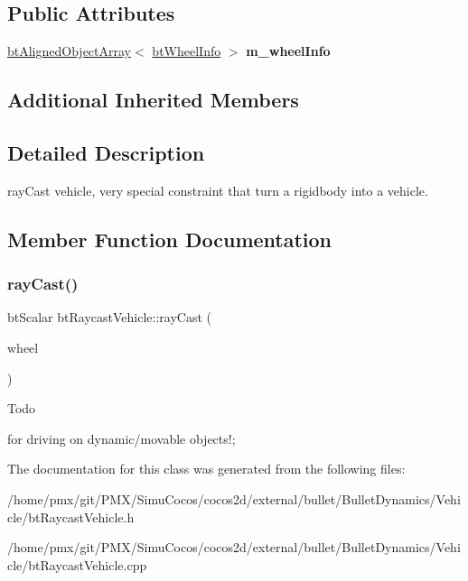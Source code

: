 \subsection*{Public Attributes}
\begin{DoxyCompactItemize}
\item 
\mbox{\label{classbtRaycastVehicle_aae4a5468270c26dbfa0b882092fac990}} 
\hyperlink{classbtAlignedObjectArray}{bt\+Aligned\+Object\+Array}$<$ \hyperlink{structbtWheelInfo}{bt\+Wheel\+Info} $>$ {\bfseries m\+\_\+wheel\+Info}
\end{DoxyCompactItemize}
\subsection*{Additional Inherited Members}


\subsection{Detailed Description}
ray\+Cast vehicle, very special constraint that turn a rigidbody into a vehicle. 

\subsection{Member Function Documentation}
\mbox{\label{classbtRaycastVehicle_a53451c4e3495561f3f078b2041ef04be}} 
\subsubsection{\texorpdfstring{ray\+Cast()}{rayCast()}}
{\footnotesize\ttfamily bt\+Scalar bt\+Raycast\+Vehicle\+::ray\+Cast (\begin{DoxyParamCaption}\item[{\hyperlink{structbtWheelInfo}{bt\+Wheel\+Info} \&}]{wheel }\end{DoxyParamCaption})}

\begin{DoxyRefDesc}{Todo}
\item[\hyperlink{todo__todo000035}{Todo}]for driving on dynamic/movable objects!; \end{DoxyRefDesc}


The documentation for this class was generated from the following files\+:\begin{DoxyCompactItemize}
\item 
/home/pmx/git/\+P\+M\+X/\+Simu\+Cocos/cocos2d/external/bullet/\+Bullet\+Dynamics/\+Vehicle/bt\+Raycast\+Vehicle.\+h\item 
/home/pmx/git/\+P\+M\+X/\+Simu\+Cocos/cocos2d/external/bullet/\+Bullet\+Dynamics/\+Vehicle/bt\+Raycast\+Vehicle.\+cpp\end{DoxyCompactItemize}
